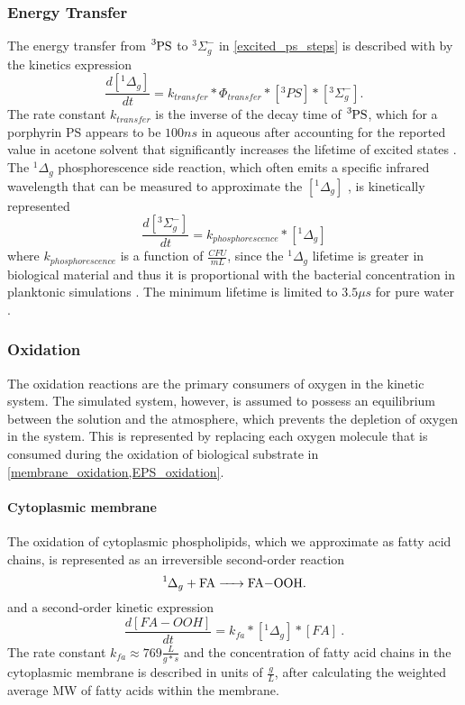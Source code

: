 \subsubsection{Energy Transfer}
The energy transfer from $\ce{^3PS}$ to $^3\Sigma_g^-$  in \cref{excited_ps_steps} is described with by the kinetics expression
\begin{equation} \label{energy_transfer_kinetics}
    \frac{d[^1\Delta_g]}{dt} = k_{transfer}*\Phi_{transfer}*[^3PS]*[^3\Sigma_g^-]. 
\end{equation}
The rate constant $k_{transfer}$ is the inverse of the decay time of $\ce{^3PS}$, which for a porphyrin PS appears to be $100 ns$ in aqueous after accounting for the reported value \cite{Kupper2002KineticsOxygen} in acetone solvent that significantly increases the lifetime of excited states \cite{Spikes1992QuantumUroporphyrin}. The $^1\Delta_g$ phosphorescence side reaction, which often emits a specific infrared wavelength that can be measured to approximate the $[^1\Delta_g]$ \cite{Macpherson1993DirectCentres}, is kinetically represented 
\begin{equation}
    \frac{d[^3\Sigma_g^-]}{dt} = k_{phosphorescence}*[^1\Delta_g]
\end{equation}
where $k_{phosphorescence}$ is a function of $\frac{CFU}{mL}$, since the $^1\Delta_g$ lifetime is greater in biological material and thus it is proportional with the bacterial concentration in planktonic simulations \cite{Maisch2007TheBacteria}. The minimum lifetime is limited to $3.5\mu s$ for pure water \cite{Baier2005Time-resolvedCells}.

\subsubsection{Oxidation}
The oxidation reactions are the primary consumers of oxygen in the kinetic system. The simulated system, however, is assumed to possess an equilibrium between the solution and the atmosphere, which prevents the depletion of oxygen in the system. This is represented by replacing each oxygen molecule that is consumed during the oxidation of biological substrate in \cref{membrane_oxidation,EPS_oxidation}.

\paragraph{Cytoplasmic membrane} 
The oxidation of cytoplasmic phospholipids, which we approximate as fatty acid chains, is represented as an irreversible second-order reaction \cite{Watabe2007OxidationMembranes.}
\begin{equation} \label{membrane_oxidation}
    \ce{^1\Delta_g + FA -> FA-OOH}.
\end{equation}
and a second-order kinetic expression
\begin{equation} \label{membrane_oxidation_kinetics}
    \frac{d[FA-OOH]}{dt} = k_{fa}*[^1\Delta_g]*[FA]~.
\end{equation}
The rate constant $k_{fa} \approx 769 \frac{L}{g*s}$ \cite{Mukai2019KineticSolution} and the concentration of fatty acid chains in the cytoplasmic membrane is described in units of $\frac{g}{L}$, after calculating the weighted average MW of fatty acids within the membrane. 


